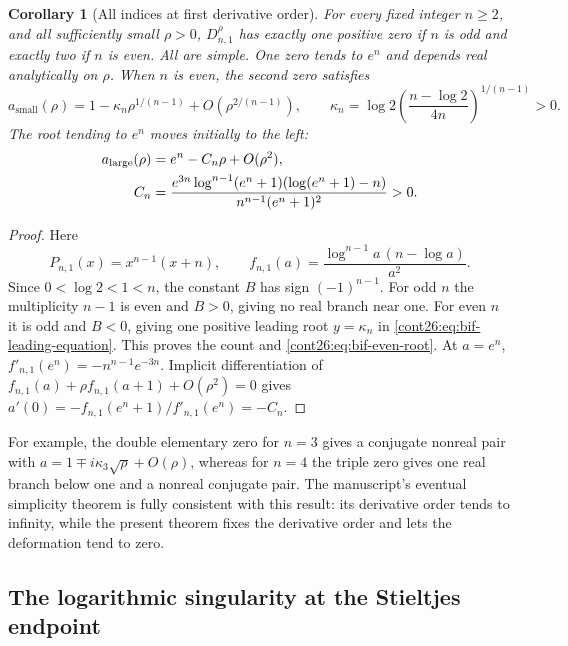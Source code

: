 \documentclass[11pt,letterpaper]{article}
\numberwithin{equation}{section}
\theoremstyle{plain}
\newtheorem{corollary}[theorem]{Corollary}
\theoremstyle{definition}
\theoremstyle{remark}
\begin{document}
\begin{corollary}[All indices at first derivative order]
\label{cont26:cor:bif-kone}
For every fixed integer $n\geq2$, and all sufficiently small $\rho>0$,
$D_{n,1}^{\rho}$ has exactly one positive zero if $n$ is odd and
exactly two if $n$ is even. All are simple. One zero tends to $e^n$
and depends real analytically on $\rho$. When $n$ is even, the second
zero satisfies
\begin{equation}\label{cont26:eq:bif-even-root}
 a_{\mathrm{small}}(\rho)=1-\kappa_n\rho^{1/(n-1)}
             +O(\rho^{2/(n-1)}),\qquad
 \kappa_n=\log2\left(\frac{n-\log2}{4n}\right)^{1/(n-1)}>0.
\end{equation}
The root tending to $e^n$ moves initially to the left:
\begin{align}\label{cont26:eq:bif-large-root}
 a_{\mathrm{large}}(\rho)&=e^n-C_n\rho+O(\rho^2),\\
 C_n&=\frac{e^{3n}\log^{n-1}(e^n+1)
                    (\log(e^n+1)-n)}{n^{n-1}(e^n+1)^2}>0.\notag
\end{align}
\end{corollary}
\begin{proof}
Here
\[
 P_{n,1}(x)=x^{n-1}(x+n),\qquad
 f_{n,1}(a)=\frac{\log^{n-1}a\,(n-\log a)}{a^2}.
\]
Since $0<\log2<1<n$, the constant $B$ has sign $(-1)^{n-1}$.
For odd $n$ the multiplicity $n-1$ is even and $B>0$, giving no
real branch near one. For even $n$ it is odd and $B<0$, giving one
positive leading root $y=\kappa_n$ in \eqref{cont26:eq:bif-leading-equation}.
This proves the count and \eqref{cont26:eq:bif-even-root}.
At $a=e^n$,
$f'_{n,1}(e^n)=-n^{n-1}e^{-3n}$. Implicit differentiation of
$f_{n,1}(a)+\rho f_{n,1}(a+1)+O(\rho^2)=0$ gives
$a'(0)=-f_{n,1}(e^n+1)/f'_{n,1}(e^n)=-C_n$.
\end{proof}

For example, the double elementary zero for $n=3$ gives a conjugate
nonreal pair with
$a=1\mp i\kappa_3\sqrt\rho+O(\rho)$, whereas for $n=4$ the triple zero
gives one real branch below one and a nonreal conjugate pair. The
manuscript's eventual simplicity theorem is fully consistent with
this result: its derivative order tends to infinity, while the present
theorem fixes the derivative order and lets the deformation tend to zero.

\subsection{The logarithmic singularity at the Stieltjes endpoint}
\end{document}
